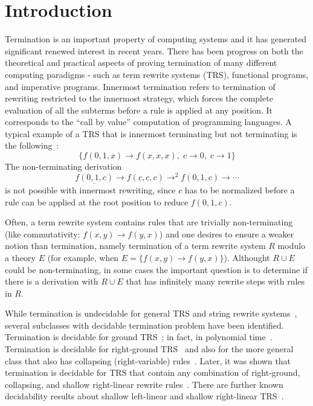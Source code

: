\documentclass{LMCS}
\theoremstyle{plain}
\begin{document}
\maketitle

\section{Introduction}

\noindent Termination is an important property of
computing systems and it has
generated significant renewed interest in 
recent years.  
There has been progress on both the theoretical
and practical aspects of proving
termination of many different computing 
paradigms - such as 
term rewrite systems (TRS), 
functional programs, and 
imperative programs.
Innermost termination refers to termination of rewriting
restricted to the innermost strategy, which forces
the complete evaluation of all the subterms before
a rule is applied at any position. It
corresponds to the ``call by value'' computation of programming languages.
A typical example of a TRS that is innermost terminating
but not terminating is the following~\cite{Toy87b}:
$$
\{f(0,1,x)\rightarrow f(x,x,x),\;c\rightarrow 0,\;c\rightarrow 1\}
$$
The non-terminating derivation
$$
\underline{f(0,1,c)}\rightarrow f(\underline{c},\underline{c},c)
\rightarrow^2 f(0,1,c)\rightarrow \cdots
$$
is not possible with innermost rewriting, since $c$ has to
be normalized before a rule can be applied at the root position 
to reduce $f(0,1,c)$.

Often, a term rewrite system contains rules
that are trivially non-terminating (like commutativity:
$f(x,y)\to f(y,x)$) and one desires to ensure a weaker
notion than termination, namely 
termination of a term rewrite system $R$ modulo a theory $E$
(for example, when $E=\{f(x,y)\to f(y,x)\}$).
Althought $R\cup E$ could be non-terminating, in some
cases the important question is to determine if there is
a derivation with $R\cup E$ that has infinitely many rewrite
steps with rules in $R$.

While termination is
undecidable for general TRS
and string rewrite systems~\cite{HuetLankford78},
several subclasses with decidable termination
problem have been identified.  
Termination is decidable for ground TRS~\cite{HuetLankford78};
in fact, in polynomial time~\cite{Plaisted93:RTA}.
Termination is decidable for right-ground
TRS~\cite{Dershowitz81:ICALP} and also for the more general class
that also has collapsing (right-variable) rules~\cite{GodoyTiwari04:IJCAR}. 
Later, it was shown that termination is decidable for
TRS that contain any combination of right-ground, collapsing, and
shallow right-linear rewrite rules~\cite{GodoyTiwari05:CADE}.
There are further known decidability results about
shallow left-linear and shallow right-linear TRS~\cite{Sakai06}.
\end{document}
